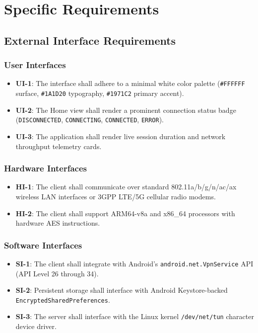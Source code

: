 \section{Specific Requirements}

\subsection{External Interface Requirements}

\subsubsection{User Interfaces}
\begin{itemize}
    \item \textbf{UI-1}: The interface shall adhere to a minimal white color palette (\texttt{\#FFFFFF} surface, \texttt{\#1A1D20} typography, \texttt{\#1971C2} primary accent).
    \item \textbf{UI-2}: The Home view shall render a prominent connection status badge (\texttt{DISCONNECTED}, \texttt{CONNECTING}, \texttt{CONNECTED}, \texttt{ERROR}).
    \item \textbf{UI-3}: The application shall render live session duration and network throughput telemetry cards.
\end{itemize}

\subsubsection{Hardware Interfaces}
\begin{itemize}
    \item \textbf{HI-1}: The client shall communicate over standard 802.11a/b/g/n/ac/ax wireless LAN interfaces or 3GPP LTE/5G cellular radio modems.
    \item \textbf{HI-2}: The client shall support ARM64-v8a and x86\_64 processors with hardware AES instructions.
\end{itemize}

\subsubsection{Software Interfaces}
\begin{itemize}
    \item \textbf{SI-1}: The client shall integrate with Android's \texttt{android.net.VpnService} API (API Level 26 through 34).
    \item \textbf{SI-2}: Persistent storage shall interface with Android Keystore-backed \texttt{EncryptedSharedPreferences}.
    \item \textbf{SI-3}: The server shall interface with the Linux kernel \texttt{/dev/net/tun} character device driver.
\end{itemize}

